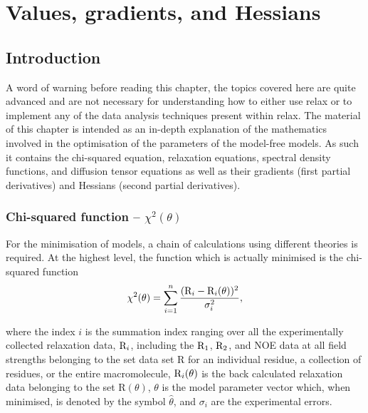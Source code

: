 
\chapter{Values, gradients, and Hessians}




\section{Introduction}


A word of warning before reading this chapter, the topics covered here are quite advanced and are not necessary for understanding how to either use relax or to implement any of the data analysis techniques present within relax.  The material of this chapter is intended as an in-depth explanation of the mathematics involved in the optimisation of the parameters of the model-free models.  As such it contains the chi-squared equation, relaxation equations, spectral density functions, and diffusion tensor equations as well as their gradients (first partial derivatives) and Hessians (second partial derivatives).



\subsection{Chi-squared function -- $\chi^2(\theta)$}

For the minimisation of models, a chain of calculations using different theories is required.  At the highest level, the function which is actually minimised is the chi-squared function
\begin{equation} \label{eq: chi-squared}
 \chi^2(\theta) = \sum_{i=1}^n \frac{(\mathrm{R}_i - \mathrm{R}_i(\theta))^2}{\sigma_i^2},
\end{equation}

\noindent where the index $i$ is the summation index ranging over all the experimentally collected relaxation data, $\mathrm{R}_i$, including the $\mathrm{R}_1$, $\mathrm{R}_2$, and NOE data at all field strengths belonging to the set data set R for an individual residue, a collection of residues, or the entire macromolecule, $\mathrm{R}_i(\theta)$ is the back calculated relaxation data belonging to the set R$(\theta)$, $\theta$ is the model parameter vector which, when minimised, is denoted by the symbol $\hat\theta$, and $\sigma_i$ are the experimental errors.

